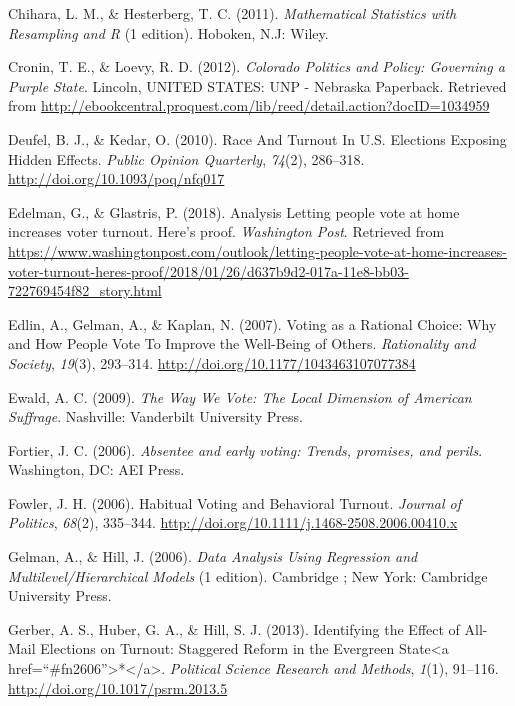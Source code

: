 \documentclass[12pt,twoside]{reedthesis}
\begin{document}
  \hypertarget{ref-chihara_mathematical_2011}{}
  Chihara, L. M., \& Hesterberg, T. C. (2011). \emph{Mathematical
  Statistics with Resampling and R} (1 edition). Hoboken, N.J: Wiley.
  
  \hypertarget{ref-cronin_colorado_2012}{}
  Cronin, T. E., \& Loevy, R. D. (2012). \emph{Colorado Politics and
  Policy: Governing a Purple State}. Lincoln, UNITED STATES: UNP -
  Nebraska Paperback. Retrieved from
  \url{http://ebookcentral.proquest.com/lib/reed/detail.action?docID=1034959}
  
  \hypertarget{ref-deufel_race_2010}{}
  Deufel, B. J., \& Kedar, O. (2010). Race And Turnout In U.S. Elections
  Exposing Hidden Effects. \emph{Public Opinion Quarterly}, \emph{74}(2),
  286--318. \url{http://doi.org/10.1093/poq/nfq017}
  
  \hypertarget{ref-edelman_analysis_2018}{}
  Edelman, G., \& Glastris, P. (2018). Analysis Letting people vote at
  home increases voter turnout. Here's proof. \emph{Washington Post}.
  Retrieved from
  \url{https://www.washingtonpost.com/outlook/letting-people-vote-at-home-increases-voter-turnout-heres-proof/2018/01/26/d637b9d2-017a-11e8-bb03-722769454f82_story.html}
  
  \hypertarget{ref-edlin_voting_2007}{}
  Edlin, A., Gelman, A., \& Kaplan, N. (2007). Voting as a Rational
  Choice: Why and How People Vote To Improve the Well-Being of Others.
  \emph{Rationality and Society}, \emph{19}(3), 293--314.
  \url{http://doi.org/10.1177/1043463107077384}
  
  \hypertarget{ref-ewald_way_2009}{}
  Ewald, A. C. (2009). \emph{The Way We Vote: The Local Dimension of
  American Suffrage}. Nashville: Vanderbilt University Press.
  
  \hypertarget{ref-fortier_absentee_2006}{}
  Fortier, J. C. (2006). \emph{Absentee and early voting: Trends,
  promises, and perils}. Washington, DC: AEI Press.
  
  \hypertarget{ref-fowler_habitual_2006}{}
  Fowler, J. H. (2006). Habitual Voting and Behavioral Turnout.
  \emph{Journal of Politics}, \emph{68}(2), 335--344.
  \url{http://doi.org/10.1111/j.1468-2508.2006.00410.x}
  
  \hypertarget{ref-gelman_data_2006}{}
  Gelman, A., \& Hill, J. (2006). \emph{Data Analysis Using Regression and
  Multilevel/Hierarchical Models} (1 edition). Cambridge ; New York:
  Cambridge University Press.
  
  \hypertarget{ref-gerber_identifying_2013}{}
  Gerber, A. S., Huber, G. A., \& Hill, S. J. (2013). Identifying the
  Effect of All-Mail Elections on Turnout: Staggered Reform in the
  Evergreen State\textless{}a
  href=``\#fn2606''\textgreater{}*\textless{}/a\textgreater{}.
  \emph{Political Science Research and Methods}, \emph{1}(1), 91--116.
  \url{http://doi.org/10.1017/psrm.2013.5}
  
\end{document}
